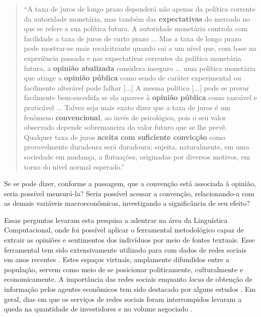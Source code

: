 \begin{quote}
\footnotesize %
\setlength{\leftskip}{2cm} 
\enquote{A taxa de juros de longo prazo dependerá não apenas da política corrente da autoridade monetária, mas também das \textbf{expectativas} do mercado no que se refere a sua política futura. A autoridade monetária controla com facilidade a taxa de juros de curto prazo ... Mas a taxa de longo prazo pode mostrar-se mais recalcitrante quando cai a um nível que, com base na experiência passada e nas expectativas correntes da política monetária futura, a \textbf{opinião abalizada} considera inseguro ... uma política monetária que atinge a \textbf{opinião pública} como sendo de caráter experimental ou facilmente alterável pode falhar [...] A mesma política [...] pode se provar facilmente bem-sucedida se ela aparece à \textbf{opinião pública} como razoável e praticável ... Talvez seja mais exato dizer que a taxa de juros é um fenômeno \textbf{convencional}, ao invés de psicológico, pois o seu valor observado depende sobremaneira do valor futuro que se lhe prevê. Qualquer taxa de juros \textbf{aceita com suficiente convicção} como provavelmente duradoura será duradoura; sujeita, naturalmente, em uma sociedade em mudança, a flutuações, originadas por diversos motivos, em torno do nível normal esperado.} \parencite[p. 203, grifos do autor]{keynes_teoria_1996}
\end{quote}

Se se pode dizer, conforme a passagem, que a convenção está associada à opinião, seria possível mensurá-la? Seria possível acessar a convenção, relacionando-a com as demais variáveis macroeconômicas, investigando a significância de seu efeito? 

Essas perguntas levaram esta pesquisa a adentrar na área da Linguística Computacional, onde foi possível aplicar o ferramental metodológico capaz de extrair as opiniões e sentimentos dos indivíduos por meio de fontes textuais. Esse ferramental tem sido extensivamente utilizado para com dados de redes sociais em anos recentes \parencite{carosia_analyzing_2020, garcia_topic_2021, de_melo_comparing_2021, de_carvalho_mining_2022}. Estes espaços virtuais, amplamente difundidos entre a população, servem como meio de se posicionar politicamente, culturalmente e economicamente. A importância das redes sociais enquanto \textit{locus} de obtenção de informação pelos agentes econômicos tem sido destacado por alguns estudos \parencite{carosia_analyzing_2020, paiva_essays_2022}. Em geral, dias em que os serviços de redes sociais foram interrompidos levaram a queda na quantidade de investidores e no volume negociado \parencite{paiva_essays_2022}.


